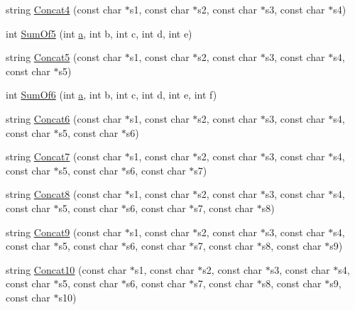 \begin{DoxyCompactItemize}
\item 
string \hyperlink{namespacetesting_1_1gmock__generated__actions__test_a18260e53a4612dc68eaa3b43a13ad57e}{Concat4} (const char $\ast$s1, const char $\ast$s2, const char $\ast$s3, const char $\ast$s4)
\item 
int \hyperlink{namespacetesting_1_1gmock__generated__actions__test_a7ebfbfdf11d92d4f99df6b659c371e74}{Sum\+Of5} (int \hyperlink{_07copy_08_2_read_camera_model_8m_a551a3d351eadcc0b9b1a2f24f0fb5ea0}{a}, int b, int c, int d, int e)
\item 
string \hyperlink{namespacetesting_1_1gmock__generated__actions__test_ac9d254c06f94974ffb0acd8d0f1f8d88}{Concat5} (const char $\ast$s1, const char $\ast$s2, const char $\ast$s3, const char $\ast$s4, const char $\ast$s5)
\item 
int \hyperlink{namespacetesting_1_1gmock__generated__actions__test_a3f60acee43510c1603549a1f3bab61ad}{Sum\+Of6} (int \hyperlink{_07copy_08_2_read_camera_model_8m_a551a3d351eadcc0b9b1a2f24f0fb5ea0}{a}, int b, int c, int d, int e, int f)
\item 
string \hyperlink{namespacetesting_1_1gmock__generated__actions__test_a0d9c60ff363796e3edec3587ce7fc856}{Concat6} (const char $\ast$s1, const char $\ast$s2, const char $\ast$s3, const char $\ast$s4, const char $\ast$s5, const char $\ast$s6)
\item 
string \hyperlink{namespacetesting_1_1gmock__generated__actions__test_ac53c9939d35ebbb093b795161fc42504}{Concat7} (const char $\ast$s1, const char $\ast$s2, const char $\ast$s3, const char $\ast$s4, const char $\ast$s5, const char $\ast$s6, const char $\ast$s7)
\item 
string \hyperlink{namespacetesting_1_1gmock__generated__actions__test_aa6540c5cd5e5cb3ca2253739c05323e8}{Concat8} (const char $\ast$s1, const char $\ast$s2, const char $\ast$s3, const char $\ast$s4, const char $\ast$s5, const char $\ast$s6, const char $\ast$s7, const char $\ast$s8)
\item 
string \hyperlink{namespacetesting_1_1gmock__generated__actions__test_a524a8b6e13732969d177254474c94e2b}{Concat9} (const char $\ast$s1, const char $\ast$s2, const char $\ast$s3, const char $\ast$s4, const char $\ast$s5, const char $\ast$s6, const char $\ast$s7, const char $\ast$s8, const char $\ast$s9)
\item 
string \hyperlink{namespacetesting_1_1gmock__generated__actions__test_ae90b9884fe6a44fa67c323c4f2f46d4f}{Concat10} (const char $\ast$s1, const char $\ast$s2, const char $\ast$s3, const char $\ast$s4, const char $\ast$s5, const char $\ast$s6, const char $\ast$s7, const char $\ast$s8, const char $\ast$s9, const char $\ast$s10)

\end{DoxyCompactItemize}
